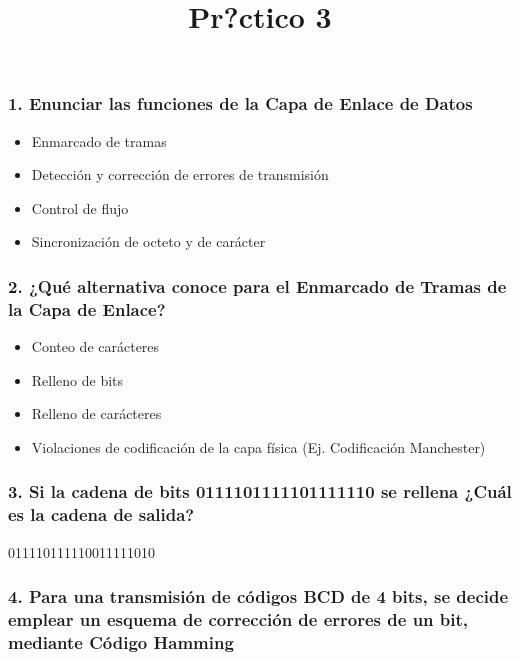 \documentclass{article}
\title{Pr?ctico 3}
\begin{document}
    
    
    \maketitle
    
    \subsubsection{1. Enunciar las funciones de la Capa de Enlace de
Datos}\label{enunciar-las-funciones-de-la-capa-de-enlace-de-datos}

\begin{itemize}
\itemsep1pt\parskip0pt
\item
  Enmarcado de tramas
\item
  Detección y corrección de errores de transmisión
\item
  Control de flujo
\item
  Sincronización de octeto y de carácter
\end{itemize}

\subsubsection{2. ¿Qué alternativa conoce para el Enmarcado de Tramas de
la Capa de
Enlace?}\label{quuxe9-alternativa-conoce-para-el-enmarcado-de-tramas-de-la-capa-de-enlace}

\begin{itemize}
\itemsep1pt\parskip0pt
\item
  Conteo de carácteres
\item
  Relleno de bits
\item
  Relleno de carácteres
\item
  Violaciones de codificación de la capa física (Ej. Codificación
  Manchester)
\end{itemize}

\subsubsection{3. Si la cadena de bits 0111101111101111110 se rellena
¿Cuál es la cadena de
salida?}\label{si-la-cadena-de-bits-0111101111101111110-se-rellena-cuuxe1l-es-la-cadena-de-salida}

011110111110011111010

\subsubsection{4. Para una transmisión de códigos BCD de 4 bits, se
decide emplear un esquema de corrección de errores de un bit, mediante
Código
Hamming}\label{para-una-transmisiuxf3n-de-cuxf3digos-bcd-de-4-bits-se-decide-emplear-un-esquema-de-correcciuxf3n-de-errores-de-un-bit-mediante-cuxf3digo-hamming}
\end{document}
